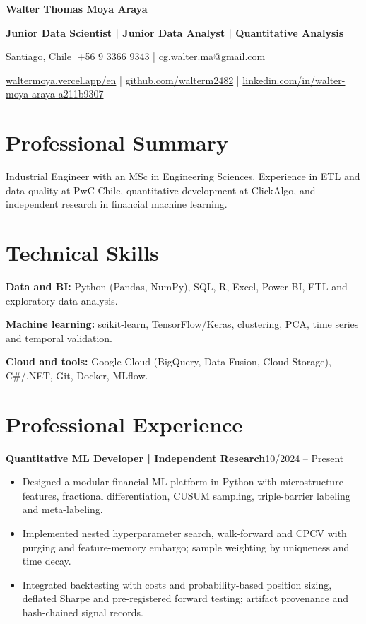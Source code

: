 \documentclass[10pt,a4paper]{article}
\newcommand{\entry}[2]{\par\addvspace{3pt}\textbf{#1}\hfill{\fontsize{9.5}{11}\selectfont\color{muted}#2}\par\nopagebreak}
\begin{document}
\fontsize{10.7}{12.5}\selectfont
\RaggedRight
{}

{\fontsize{23}{26}\selectfont\bfseries\color{navy}Walter Thomas Moya Araya}\par
{\fontsize{11}{13}\selectfont\bfseries Junior Data Scientist | Junior Data Analyst | Quantitative Analysis}\par
{\fontsize{9.7}{11.5}\selectfont
Santiago, Chile \enspace|\enspace \href{tel:+56933669343}{+56 9 3366 9343} \enspace|\enspace
\href{mailto:cg.walter.ma@gmail.com}{cg.walter.ma@gmail.com}\par
\href{https://waltermoya.vercel.app/en}{waltermoya.vercel.app/en} \enspace|\enspace
\href{https://github.com/walterm2482}{github.com/walterm2482} \enspace|\enspace
\href{https://www.linkedin.com/in/walter-moya-araya-a211b9307/}{linkedin.com/in/walter-moya-araya-a211b9307}}

\section{Professional Summary}
Industrial Engineer with an MSc in Engineering Sciences. Experience in ETL and data quality at PwC Chile,
quantitative development at ClickAlgo, and independent research in financial machine learning.

\section{Technical Skills}
\textbf{Data and BI:} Python (Pandas, NumPy), SQL, R, Excel, Power BI, ETL and exploratory data analysis.\par
\textbf{Machine learning:} scikit-learn, TensorFlow/Keras, clustering, PCA, time series and temporal validation.\par
\textbf{Cloud and tools:} Google Cloud (BigQuery, Data Fusion, Cloud Storage), C\#/.NET, Git, Docker, MLflow.

\section{Professional Experience}
\entry{Quantitative ML Developer | Independent Research}{10/2024 -- Present}
\begin{itemize}
  \item Designed a modular financial ML platform in Python with microstructure features, fractional
  differentiation, CUSUM sampling, triple-barrier labeling and meta-labeling.
  \item Implemented nested hyperparameter search, walk-forward and CPCV with purging and feature-memory
  embargo; sample weighting by uniqueness and time decay.
  \item Integrated backtesting with costs and probability-based position sizing, deflated Sharpe and
  pre-registered forward testing; artifact provenance and hash-chained signal records.
\end{itemize}
\end{document}
